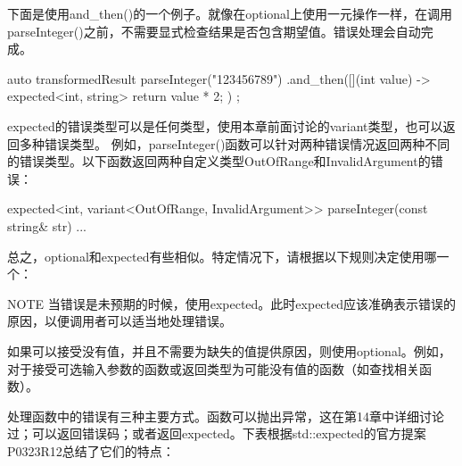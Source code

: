下面是使用and\_then()的一个例子。就像在optional上使用一元操作一样，在调用parseInteger()之前，不需要显式检查结果是否包含期望值。错误处理会自动完成。

\begin{cpp}
auto transformedResult { parseInteger("123456789")
    .and_then([](int value) -> expected<int, string> { return value * 2; }) };
\end{cpp}

expected的错误类型可以是任何类型，使用本章前面讨论的variant类型，也可以返回多种错误类型。 例如，parseInteger()函数可以针对两种错误情况返回两种不同的错误类型。以下函数返回两种自定义类型OutOfRange和InvalidArgument的错误：


\begin{cpp}
expected<int, variant<OutOfRange, InvalidArgument>>
    parseInteger(const string& str) { ... }
\end{cpp}

总之，optional和expected有些相似。特定情况下，请根据以下规则决定使用哪一个：

\begin{myNotic}{NOTE}
当错误是未预期的时候，使用expected。此时expected应该准确表示错误的原因，以便调用者可以适当地处理错误。

如果可以接受没有值，并且不需要为缺失的值提供原因，则使用optional。例如，对于接受可选输入参数的函数或返回类型为可能没有值的函数（如查找相关函数）。
\end{myNotic}


处理函数中的错误有三种主要方式。函数可以抛出异常，这在第14章中详细讨论过；可以返回错误码；或者返回expected。下表根据std::expected的官方提案P0323R12总结了它们的特点：

